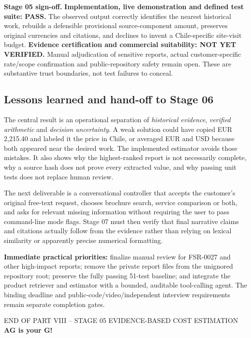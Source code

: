 \documentclass[11pt,a4paper]{article}
\begin{document}
\begin{keybox}
\textbf{Stage 05 sign-off.} \textbf{Implementation, live demonstration and defined test suite: PASS.} The observed output correctly identifies the nearest historical work, rebuilds a defensible provisional source-component amount, preserves original currencies and citations, and declines to invent a Chile-specific site-visit budget. \textbf{Evidence certification and commercial suitability: NOT YET VERIFIED.} Manual adjudication of sensitive reports, actual customer-specific rate/scope confirmation and public-repository safety remain open. These are substantive trust boundaries, not test failures to conceal.
\end{keybox}

\subsection{Lessons learned and hand-off to Stage 06}
The central result is an operational separation of \emph{historical evidence}, \emph{verified arithmetic} and \emph{decision uncertainty}. A weak solution could have copied EUR 2,215.40 and labeled it the price in Chile, or averaged EUR and USD because both appeared near the desired work. The implemented estimator avoids those mistakes. It also shows why the highest-ranked report is not necessarily complete, why a source hash does not prove every extracted value, and why passing unit tests does not replace human review.

The next deliverable is a conversational controller that accepts the customer's original free-text request, chooses brochure search, service comparison or both, and asks for relevant missing information without requiring the user to pass command-line mode flags. Stage 07 must then verify that final narrative claims and citations actually follow from the evidence rather than relying on lexical similarity or apparently precise numerical formatting.

\textbf{Immediate practical priorities:} finalize manual review for FSR-0027 and other high-impact reports; remove the private report files from the unignored repository root; preserve the fully passing 51-test baseline; and integrate the product retriever and estimator with a bounded, auditable tool-calling agent. The binding deadline and public-code/video/independent interview requirements remain separate completion gates.

\vspace{4mm}
\begin{center}
{\sffamily\color{Gray}\footnotesize END OF PART VIII -- STAGE 05 EVIDENCE-BASED COST ESTIMATION}\\[2mm]
{\sffamily\bfseries\color{Navy}AG is your G!}
\end{center}
\end{document}
